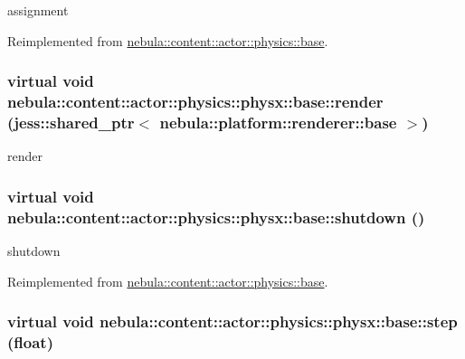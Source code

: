 assignment 

Reimplemented from \hyperlink{classnebula_1_1content_1_1actor_1_1physics_1_1base_a8b950d8d7230bd6899cb3da7b6116f02}{nebula::content::actor::physics::base}.\hypertarget{classnebula_1_1content_1_1actor_1_1physics_1_1physx_1_1base_a9354c5be1ef0900bc013f8b215f1a6b3}{
\subsubsection[{render}]{\setlength{\rightskip}{0pt plus 5cm}virtual void nebula::content::actor::physics::physx::base::render (jess::shared\_\-ptr$<$ {\bf nebula::platform::renderer::base} $>$)}}
\label{classnebula_1_1content_1_1actor_1_1physics_1_1physx_1_1base_a9354c5be1ef0900bc013f8b215f1a6b3}


render \hypertarget{classnebula_1_1content_1_1actor_1_1physics_1_1physx_1_1base_a35c49f55a68b66eb88f46a8916f54d4c}{
\subsubsection[{shutdown}]{\setlength{\rightskip}{0pt plus 5cm}virtual void nebula::content::actor::physics::physx::base::shutdown ()}}
\label{classnebula_1_1content_1_1actor_1_1physics_1_1physx_1_1base_a35c49f55a68b66eb88f46a8916f54d4c}


shutdown 

Reimplemented from \hyperlink{classnebula_1_1content_1_1actor_1_1physics_1_1base_a6de64e1ab1a4e3dd3274bfa722c7aed1}{nebula::content::actor::physics::base}.\hypertarget{classnebula_1_1content_1_1actor_1_1physics_1_1physx_1_1base_ac9cab33b0b85222cd24c0238fadb6b85}{
\subsubsection[{step}]{\setlength{\rightskip}{0pt plus 5cm}virtual void nebula::content::actor::physics::physx::base::step (float)}}
\label{classnebula_1_1content_1_1actor_1_1physics_1_1physx_1_1base_ac9cab33b0b85222cd24c0238fadb6b85}


